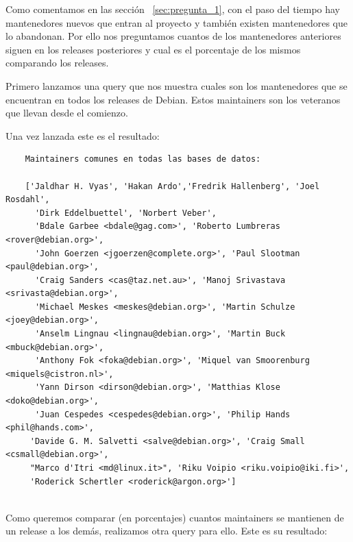 \documentclass[a4paper, 12pt]{book}
\begin{document}
Como comentamos en las sección ~\ref{sec:pregunta_1}, con el paso del tiempo hay mantenedores nuevos que entran al proyecto y también existen mantenedores que lo abandonan. Por ello nos preguntamos cuantos de los mantenedores anteriores siguen en los releases posteriores y cual es el porcentaje de los mismos comparando los releases.

Primero lanzamos una query que nos muestra cuales son los mantenedores que se encuentran en todos los releases de Debian. Estos maintainers son los veteranos que llevan desde el comienzo.

Una vez lanzada este es el resultado:
	\begin{verbatim}
	Maintainers comunes en todas las bases de datos:
	
	['Jaldhar H. Vyas', 'Hakan Ardo','Fredrik Hallenberg', 'Joel Rosdahl',
	  'Dirk Eddelbuettel', 'Norbert Veber',
	  'Bdale Garbee <bdale@gag.com>', 'Roberto Lumbreras <rover@debian.org>',
	  'John Goerzen <jgoerzen@complete.org>', 'Paul Slootman <paul@debian.org>',
	  'Craig Sanders <cas@taz.net.au>', 'Manoj Srivastava <srivasta@debian.org>',
	  'Michael Meskes <meskes@debian.org>', 'Martin Schulze <joey@debian.org>',
	  'Anselm Lingnau <lingnau@debian.org>', 'Martin Buck <mbuck@debian.org>',
	  'Anthony Fok <foka@debian.org>', 'Miquel van Smoorenburg <miquels@cistron.nl>',
	  'Yann Dirson <dirson@debian.org>', 'Matthias Klose <doko@debian.org>',
	  'Juan Cespedes <cespedes@debian.org>', 'Philip Hands <phil@hands.com>', 
	 'Davide G. M. Salvetti <salve@debian.org>', 'Craig Small <csmall@debian.org>',
	 "Marco d'Itri <md@linux.it>", 'Riku Voipio <riku.voipio@iki.fi>', 
	 'Roderick Schertler <roderick@argon.org>']
	
	\end{verbatim} 
	
	Como queremos comparar (en porcentajes) cuantos maintainers se mantienen de un release a los demás, realizamos otra query para ello.
	Este es su resultado:
	
\end{document}
